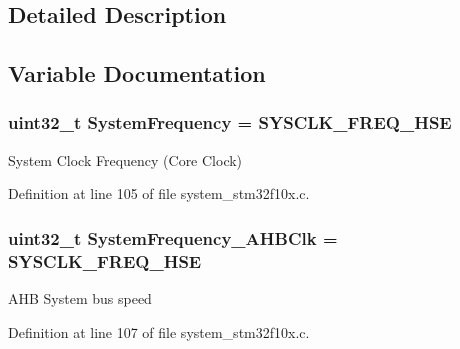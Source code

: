 \subsection{Detailed Description}


\subsection{Variable Documentation}
\hypertarget{group___s_t_m32_f10x___system___private___variables_ga17f99e8fe8a601944f7d27ea3e8c6992}{
\subsubsection[{System\-Frequency}]{ {\bf uint32\-\_\-t} System\-Frequency = S\-Y\-S\-C\-L\-K\-\_\-\-F\-R\-E\-Q\-\_\-\-H\-S\-E}}\label{group___s_t_m32_f10x___system___private___variables_ga17f99e8fe8a601944f7d27ea3e8c6992}
System Clock Frequency (Core Clock) 

Definition at line 105 of file system\-\_\-stm32f10x.\-c.

\hypertarget{group___s_t_m32_f10x___system___private___variables_ga01881aecd4a21d0ff8f8e9e0552b2f07}{
\subsubsection[{System\-Frequency\-\_\-\-A\-H\-B\-Clk}]{ {\bf uint32\-\_\-t} System\-Frequency\-\_\-\-A\-H\-B\-Clk = S\-Y\-S\-C\-L\-K\-\_\-\-F\-R\-E\-Q\-\_\-\-H\-S\-E}}\label{group___s_t_m32_f10x___system___private___variables_ga01881aecd4a21d0ff8f8e9e0552b2f07}
A\-H\-B System bus speed 

Definition at line 107 of file system\-\_\-stm32f10x.\-c.

